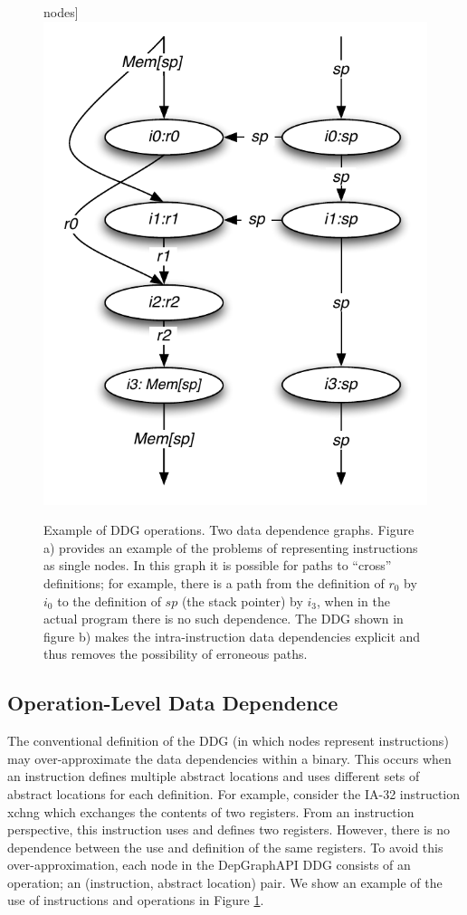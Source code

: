 \documentclass[12pt,titlepage]{article}
\begin{document}
\begin{figure}
\begin{center}
  nodes]{\label{ddg-b}\includegraphics[scale=0.75]{figs/DDG-b.pdf}}
\end{center}
\caption{Example of DDG operations.  Two data dependence
graphs. Figure a) provides an example of the problems of representing
instructions as single nodes. In this graph it is possible for paths
to ``cross'' definitions; for example, there is a path from the
definition of $r_0$ by $i_0$ to the definition of $sp$ (the stack pointer) by
$i_3$, when in the actual program there is no such dependence. The DDG
shown in figure b) makes the intra-instruction data dependencies
explicit and thus removes the possibility of erroneous paths.}
\label{OperationsGraph}
\end{figure}


\subsection{Operation-Level Data Dependence}

The conventional definition of the DDG (in which nodes represent
instructions) may over-approximate the data dependencies within a
binary. This occurs when an instruction defines multiple abstract
locations and uses different sets of abstract locations for each
definition. For example, consider the IA-32 instruction xchng which
exchanges the contents of two registers. From an instruction
perspective, this instruction uses and defines two registers. However,
there is no dependence between the use and definition of the same
registers. To avoid this over-approximation, each node in the
DepGraphAPI DDG consists of an operation; an (instruction, abstract
location) pair. We show an example of the use of instructions and
operations in Figure \ref{OperationsGraph}.
\end{document}
